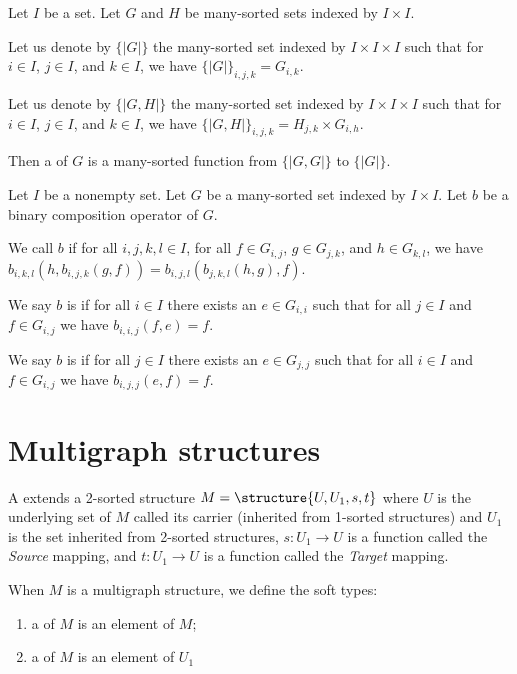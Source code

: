 \begin{definition}
Let $I$ be a set. Let $G$ and $H$ be many-sorted sets indexed by $I\times I$.

Let us denote by $\{|G|\}$ the many-sorted set indexed by $I\times I\times I$ 
such that for $i\in I$, $j\in I$, and $k\in I$, we have $\{|G|\}_{i,j,k}=G_{i,k}$.

Let us denote by $\{|G,H|\}$ the many-sorted set indexed by $I\times I\times I$ 
such that for $i\in I$, $j\in I$, and $k\in I$, we have $\{|G,H|\}_{i,j,k}=H_{j,k}\times G_{i,h}$.

Then a  of $G$ is a many-sorted
function from $\{|G,G|\}$ to $\{|G|\}$.
\end{definition}

\begin{definition}
Let $I$ be a nonempty set. Let $G$ be a many-sorted set indexed by
$I\times I$. Let $b$ be a binary composition operator of $G$.

We call $b$  if for all
$i,j,k,l\in I$, for all $f\in G_{i,j}$, $g\in G_{j,k}$, and $h\in G_{k,l}$,
we have $b_{i,k,l}(h,b_{i,j,k}(g,f))=b_{i,j,l}(b_{j,k,l}(h,g),f)$.

We say $b$ is  if for all
$i\in I$ there exists an $e\in G_{i,i}$ such that for all $j\in I$ and
$f\in G_{i,j}$ we have $b_{i,i,j}(f,e)=f$.

We say $b$ is  if for all
$j\in I$ there exists an $e\in G_{j,j}$ such that for all $i\in I$ and
$f\in G_{i,j}$ we have $b_{i,j,j}(e,f)=f$.
\end{definition}

\section{Multigraph structures}

\begin{definition}
A  extends a 2-sorted structure
$M=\structure{U,U_{1},s,t}$ where $U$ is the underlying set of $M$
called its carrier (inherited from 1-sorted structures) and $U_{1}$ is
the set inherited from 2-sorted structures, $s\colon U_{1}\to U$ is a
function called the \emph{Source} mapping, and $t\colon U_{1}\to U$
is a function called the \emph{Target} mapping.

When $M$ is a multigraph structure, we define the soft types:
\begin{enumerate}
\item a  of $M$ is an element of $M$;
\item a  of $M$ is an element of $U_{1}$
\end{enumerate}
\end{definition}


